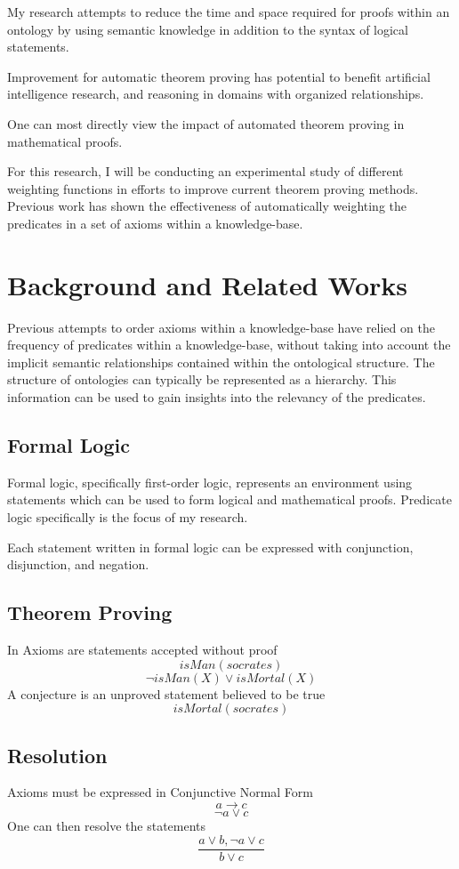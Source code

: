 \documentclass{article}
\begin{document}
My research attempts to reduce the time and space required for proofs within an ontology by using semantic knowledge in addition to the syntax of logical statements. 

Improvement for automatic theorem proving has potential to benefit artificial intelligence research, and reasoning in domains with organized relationships. 

One can most directly view the impact of automated theorem proving in mathematical proofs. 

For this research, I will be conducting an experimental study of different weighting functions in efforts to improve current theorem proving methods. Previous work has shown the effectiveness of automatically weighting the predicates in a set of axioms within a knowledge-base.

\newpage
\section{Background and Related Works}

Previous attempts to order axioms within a knowledge-base have relied on the frequency of predicates within a knowledge-base, without taking into account the implicit semantic relationships contained within the ontological structure. The structure of ontologies can typically be represented as a hierarchy. This information can be used to gain insights into the relevancy of the predicates. 

\subsection{Formal Logic}
Formal logic, specifically first-order logic, represents an environment using statements which can be used to form logical and mathematical proofs. Predicate logic specifically is the focus of my research. 

Each statement written in formal logic can be expressed with conjunction, disjunction, and negation. 
	
\subsection{Theorem Proving}
In Axioms are statements accepted without proof
        \[isMan(socrates)\]
        \[\lnot isMan(X)\lor isMortal(X)\]
	    A conjecture is an unproved statement believed to be true 
	    \[isMortal(socrates)\]
	

	\subsection{Resolution}
		Axioms must be expressed in Conjunctive Normal Form
		\[a \rightarrow c\]
		\[\lnot a \lor c\]
		One can then resolve the statements
		\[\frac{a \lor b, \lnot a \lor c }{b \lor c}\]
	
\end{document}
